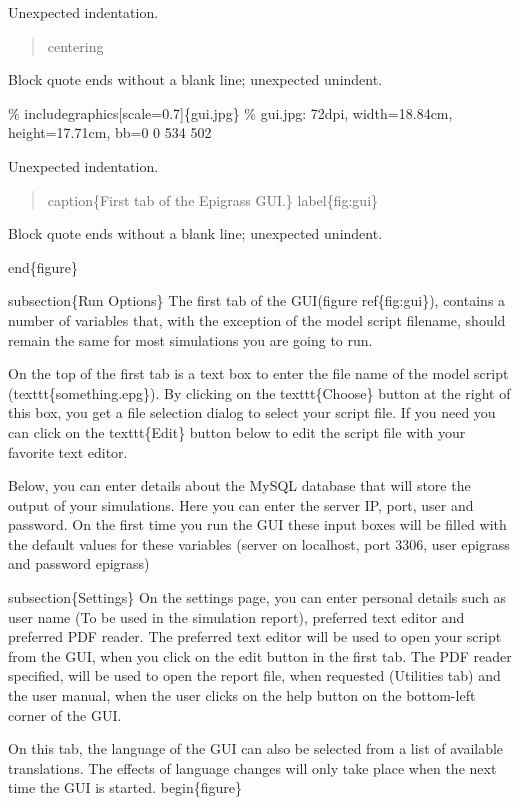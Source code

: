 \documentclass[a4paper,10pt]{manual}
\begin{document}
Unexpected indentation.

\begin{quote}

centering
\end{quote}

Block quote ends without a blank line; unexpected unindent.


\%   includegraphics{[}scale=0.7{]}\{gui.jpg\}
\% gui.jpg: 72dpi, width=18.84cm, height=17.71cm, bb=0 0 534 502

Unexpected indentation.

\begin{quote}

caption\{First tab of the Epigrass GUI.\}
label\{fig:gui\}
\end{quote}

Block quote ends without a blank line; unexpected unindent.


end\{figure\}

subsection\{Run Options\}
The first tab of the GUI(figure ref\{fig:gui\}), contains a number of variables that, with the exception of the model script filename, should remain the same for most simulations you are going to run.

On the top of the first tab is a text box to enter the file name of the model script (texttt\{something.epg\}). By clicking on the texttt\{Choose\} button at the right of this box, you get a file selection dialog to select your script file. If you need you can click on the texttt\{Edit\} button below to edit the script file with your favorite text editor.

Below, you can enter details about the MySQL database that will store the output of your simulations. Here you can enter the server IP, port, user and password. On the first time you run the GUI these input boxes will be filled with the default values for these variables (server on localhost, port 3306, user epigrass and password epigrass)

subsection\{Settings\}
On the settings page, you can enter personal details such as user name (To be used in the simulation report), preferred text editor and preferred PDF reader. The preferred text editor will be used to open your script from the GUI, when you click on the edit button in the first tab. The PDF reader specified, will be used to open the report file, when requested (Utilities tab) and the user manual, when the user clicks on the help button on the bottom-left corner of the GUI.

On this tab, the language of the GUI can also be selected from a list of available translations. The effects of language changes will only take place when the next time the GUI is started.
begin\{figure\}
\end{document}
